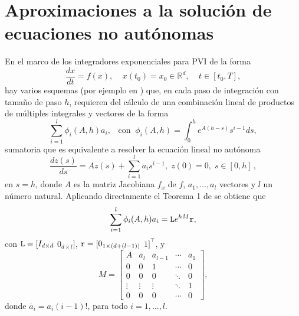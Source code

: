 \section{Aproximaciones a la solución de ecuaciones no autónomas}\label{section:approx-non-auto}
En el marco de los integradores exponenciales para PVI de la forma
\begin{equation*}
	\frac{dx}{dt}=f(x),  \;\;\;\; x(t_0)=x_0 \in \mathbb{R}^{d},   \;\;\;\; t\in[t_0,T],
\end{equation*}
hay varios esquemas (por ejemplo en \cite{tokman2006efficient,delaCruz07,hochbruck2011exponential}) que, en cada paso de integración con tamaño de paso $h$, requieren del cálculo de una combinación lineal de productos de múltiples integrales y vectores de la forma
\begin{equation*}
	\sum\limits_{i=1}^{l}\phi _{i}(A,h)a_{i},   \;\;\;\mathrm{con} \;\; \phi _{i}(A,h)=\int_{0}^{h}e^{A(h-s)}s^{i-1}ds,
\end{equation*}
sumatoria que es equivalente a resolver la ecuación lineal no autónoma \cite{delaCruz07,skaflestad2009scaling}
\begin{equation}\label{ODELinNoAut}
	\frac{dz(s)}{ds} = Az(s)+\sum\limits_{i=1}^{l}a_is^{i-1},\;z(0)=0,\;s\in [0,h]\, ,
\end{equation}
en $s=h$, donde $A$ es la matriz Jacobiana $f_x$ de $f$, $a_1,\ldots,a_l$ vectores y $l$ un número natural.
Aplicando directamente el Teorema 1 de \cite{carbonell2008computing} se obtiene que \cite{carbonell2008computing,jimenez2006local}
\begin{equation}\label{sum2_phiXv}
\sum\limits_{i=1}^{l}\phi _{i}(A,h)a_{i} = \mathtt{L} e^{h M}\mathtt{r},
\end{equation}
con $\mathtt{L}=[I_{d\times d}$ $0_{d\times l}]$, $\mathtt{r}=[0_{1\times (d+(l-1))}$ $1]^{\intercal }$, y
\begin{equation*}
M=\left[
\begin{array}{ccccc}
A & \overline{a}_{l} & \overline{a}_{l-1} & \cdots & \overline{a}_{1} \\
0 & 0 & 1 & \cdots & 0 \\
0 & 0 & 0 & \ddots & 0 \\
\vdots & \vdots & \vdots & \ddots & 1 \\
0 & 0 & 0 & \cdots & 0
\end{array}%
\right],  \label{matrixH2}
\end{equation*}%
donde $\overline{a}_{i}=a_{i}(i-1)!$, para todo $i=1,\ldots ,l$.

